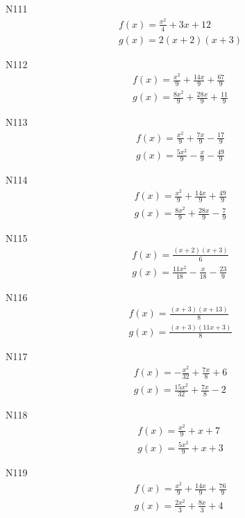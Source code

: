 \documentclass[11pt]{report}
\begin{document}
N111
\begin{align*}
 f(x) = \frac{x^{2}}{4} + 3 x + 12\\
 g(x) = 2 \left(x + 2\right) \left(x + 3\right)
\end{align*}

N112
\begin{align*}
 f(x) = \frac{x^{2}}{9} + \frac{14 x}{9} + \frac{67}{9}\\
 g(x) = \frac{8 x^{2}}{9} + \frac{28 x}{9} + \frac{11}{9}
\end{align*}

N113
\begin{align*}
 f(x) = \frac{x^{2}}{9} + \frac{7 x}{9} - \frac{17}{9}\\
 g(x) = \frac{5 x^{2}}{9} - \frac{x}{9} - \frac{49}{9}
\end{align*}

N114
\begin{align*}
 f(x) = \frac{x^{2}}{9} + \frac{14 x}{9} + \frac{49}{9}\\
 g(x) = \frac{8 x^{2}}{9} + \frac{28 x}{9} - \frac{7}{9}
\end{align*}

N115
\begin{align*}
 f(x) = \frac{\left(x + 2\right) \left(x + 3\right)}{6}\\
 g(x) = \frac{11 x^{2}}{18} - \frac{x}{18} - \frac{23}{9}
\end{align*}

N116
\begin{align*}
 f(x) = \frac{\left(x + 3\right) \left(x + 13\right)}{8}\\
 g(x) = \frac{\left(x + 3\right) \left(11 x + 3\right)}{8}
\end{align*}

N117
\begin{align*}
 f(x) = - \frac{x^{2}}{32} + \frac{7 x}{8} + 6\\
 g(x) = \frac{15 x^{2}}{32} + \frac{7 x}{8} - 2
\end{align*}

N118
\begin{align*}
 f(x) = \frac{x^{2}}{9} + x + 7\\
 g(x) = \frac{5 x^{2}}{9} + x + 3
\end{align*}

N119
\begin{align*}
 f(x) = \frac{x^{2}}{9} + \frac{14 x}{9} + \frac{76}{9}\\
 g(x) = \frac{2 x^{2}}{3} + \frac{8 x}{3} + 4
\end{align*}
\end{document}
